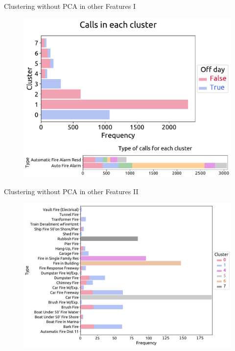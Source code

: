 \documentclass[t,11pt,compress,xcolor=table,hyperref={bookmarks=false}]{beamer}
\begin{document}
\begin{frame}{Clustering without PCA in other Features I}

\begin{figure}
\includegraphics[scale=0.35]{figs/STORY_NO_PCA_off_days.pdf}
\hspace*{-0.9cm}\includegraphics[scale=0.35]{figs/STORY_loc_type_1.pdf}
\end{figure}
\end{frame}

\begin{frame}{Clustering without PCA in other Features II}
\vspace*{-0.3cm}
\begin{figure}
\hspace*{-0.9cm}\includegraphics[scale=0.35]{figs/STORY_NO_PCA_type_2.pdf}
\end{figure}
\end{frame}
\end{document}
